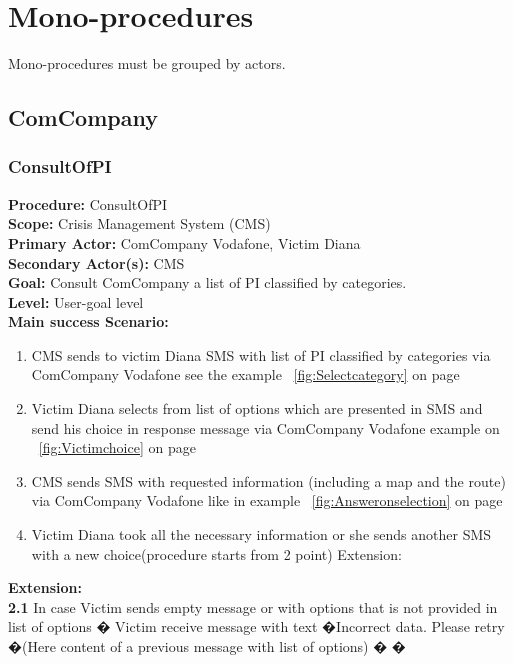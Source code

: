 \section{Mono-procedures}
Mono-procedures must be grouped by actors.

\subsection{ComCompany}

\vspace{0.5cm}
\subsubsection{ConsultOfPI}
\textbf{Procedure:} ConsultOfPI \\
\textbf{Scope:} Crisis Management System (CMS) \\
\textbf{Primary Actor:} ComCompany Vodafone, Victim Diana \\
\textbf{Secondary Actor(s):} CMS \\
\textbf{Goal:} Consult ComCompany a list of PI classified by categories. \\
\textbf{Level:} User-goal level \\
\textbf{Main success Scenario:} 
\begin{enumerate}
	\item CMS sends to victim Diana SMS with list of PI classified by categories
	via ComCompany Vodafone see the example ~\ref{fig:Selectcategory} on
	page~\pageref{fig:Selectcategory}\\
	\item Victim Diana selects from list of options which are presented in SMS and
	send his choice in response message via ComCompany Vodafone example on
	~\ref{fig:Victimchoice} on page~\pageref{fig:Victimchoice}\\
	\item CMS sends SMS with requested information (including a map and the route)
	via ComCompany Vodafone like in example ~\ref{fig:Answeronselection} on
	page~\pageref{fig:Answeronselection}\\
	\item Victim Diana took all the necessary information or she sends another SMS
	with a new choice(procedure starts from 2 point) Extension:
\end{enumerate}	
\textbf{Extension:} \\ 
\textbf{2.1} In case Victim sends empty message or with options that is
not provided in list of options � Victim receive message with text �Incorrect data. Please retry �(Here content of a previous message with list of options) � �

